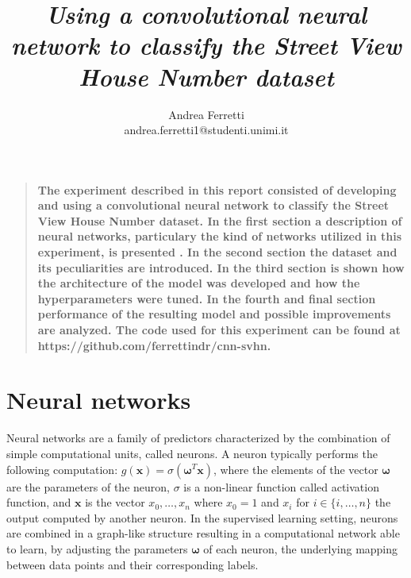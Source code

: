 \documentclass[12pt]{article}
\title{{\it Using a convolutional neural network to classify the Street View House Number dataset}}
\author
{Andrea Ferretti\\
\normalsize{andrea.ferretti1@studenti.unimi.it}
}
\date{}
\newenvironment{sciabstract}{%
\begin{quote} \bf}
{\end{quote}}
\newcommand{\vect}[1]{\boldsymbol{#1}}
\begin{document}
 


\baselineskip24pt


\maketitle 

\begin{sciabstract}
The experiment described in this report consisted of developing and using a convolutional neural network to classify the Street View House Number dataset. In the first section a description of neural networks, particulary the kind of networks utilized in this experiment,  is presented . In the second section the dataset and its peculiarities are introduced. In the third section is shown how the architecture of the model was developed and how the hyperparameters were tuned. In the fourth and final section performance of the resulting model and possible improvements are analyzed. The code used for this experiment can be found at https://github.com/ferrettindr/cnn-svhn.
\end{sciabstract}

\section*{Neural networks}
Neural networks are a family of predictors characterized by the combination of simple computational units, called neurons.
A neuron typically performs the following computation: $ g(\vect{x}) = \sigma(\vect{\omega}^T \vect{x}) $, where the elements of the vector $\vect{\omega}$ are the parameters of the neuron, $\sigma$ is a non-linear function called activation function, and $\vect{x}$ is the vector $x_0,\ldots,x_n $ where $ x_0 = 1$ and $x_i$ for $i \in \{i,\ldots,n\}$  the output computed by another neuron.
In the supervised learning setting, neurons are combined in a graph-like structure resulting in a computational network able to learn, by adjusting the parameters $\vect{\omega}$ of each neuron, the underlying mapping between data points and their corresponding labels.
\end{document}
